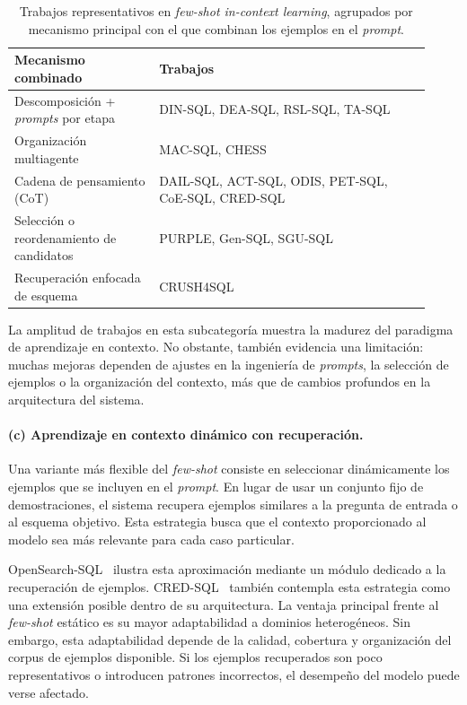 \begin{table}[!htbp]
\centering
\footnotesize
\caption{Trabajos representativos en \emph{few-shot in-context learning}, agrupados por mecanismo principal con el que combinan los ejemplos en el \emph{prompt}.}
\label{tab:sota-d1-fewshot}
\begin{tabular}{@{}p{0.32\linewidth}p{0.60\linewidth}@{}}
\toprule
\textbf{Mecanismo combinado} & \textbf{Trabajos} \\
\midrule
Descomposición + \emph{prompts} por etapa & DIN-SQL, DEA-SQL, RSL-SQL, TA-SQL \\
Organización multiagente & MAC-SQL, CHESS \\
Cadena de pensamiento (CoT) & DAIL-SQL, ACT-SQL, ODIS, PET-SQL, CoE-SQL, CRED-SQL \\
Selección o reordenamiento de candidatos & PURPLE, Gen-SQL, SGU-SQL \\
Recuperación enfocada de esquema & CRUSH4SQL \\
\bottomrule
\end{tabular}
\end{table}

La amplitud de trabajos en esta subcategoría muestra la madurez del paradigma de aprendizaje en contexto. No obstante, también evidencia una limitación: muchas mejoras dependen de ajustes en la ingeniería de \emph{prompts}, la selección de ejemplos o la organización del contexto, más que de cambios profundos en la arquitectura del sistema.

\paragraph{(c) Aprendizaje en contexto dinámico con recuperación.} 
Una variante más flexible del \emph{few-shot} consiste en seleccionar dinámicamente los ejemplos que se incluyen en el \emph{prompt}. En lugar de usar un conjunto fijo de demostraciones, el sistema recupera ejemplos similares a la pregunta de entrada o al esquema objetivo. Esta estrategia busca que el contexto proporcionado al modelo sea más relevante para cada caso particular.

OpenSearch-SQL~\cite{OpenSearch-SQL2025} ilustra esta aproximación mediante un módulo dedicado a la recuperación de ejemplos. CRED-SQL~\cite{CRED-SQL2025} también contempla esta estrategia como una extensión posible dentro de su arquitectura. La ventaja principal frente al \emph{few-shot} estático es su mayor adaptabilidad a dominios heterogéneos. Sin embargo, esta adaptabilidad depende de la calidad, cobertura y organización del corpus de ejemplos disponible. Si los ejemplos recuperados son poco representativos o introducen patrones incorrectos, el desempeño del modelo puede verse afectado.

